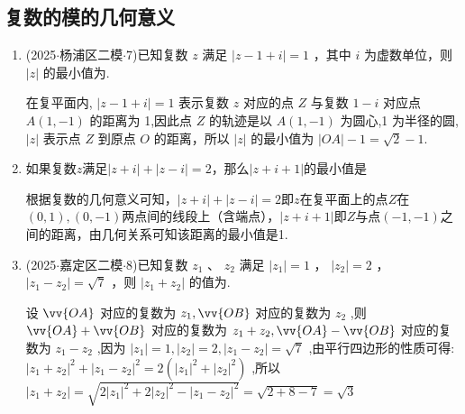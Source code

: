 \subsection*{复数的模的几何意义}
\begin{enumerate}
    \item (2025$\cdot$杨浦区二模$\cdot$7)已知复数 $z$ 满足 $\left| {z - 1 + {i}}\right|  = 1$ ，其中 ${i}$ 为虚数单位，则 $\left| z\right|$ 的最小值为.
    \begin{jieda}
        在复平面内, $\left| {z - 1 + {i}}\right|  = 1$ 表示复数 $z$ 对应的点 $Z$ 与复数 $1 - {i}$ 对应点 $A\left( {1, - 1}\right)$ 的距离为 1,因此点 $Z$ 的轨迹是以 $A\left( {1, - 1}\right)$ 为圆心,1 为半径的圆, $\left| z\right|$ 表示点 $Z$ 到原点 $O$ 的距离，所以 $\left| z\right|$ 的最小值为 $\left| {OA}\right|  - 1 = \sqrt{2} - 1$.
    \end{jieda}
    \item 如果复数$z$满足$|z+i| + |z-i| = 2$，那么$|z+i+1|$的最小值是
    \begin{jieda}
        根据复数的几何意义可知，$|z+i| + |z-i| = 2$即$z$在复平面上的点$Z$在$(0, 1), (0, -1)$两点间的线段上（含端点），$|z+i+1|$即$Z$与点$(-1, -1)$之间的距离，由几何关系可知该距离的最小值是1.
    \end{jieda}
    \item (2025$\cdot$嘉定区二模$\cdot$8)已知复数 ${z}_{1}$ 、 ${z}_{2}$ 满足 $\left| {z}_{1}\right|  = 1$ ， $\left| {z}_{2}\right|  = 2$ ， $\left| {{z}_{1} - {z}_{2}}\right|  = \sqrt{7}$ ，则 $\left| {{z}_{1} + {z}_{2}}\right|$ 的值为.
    \begin{jieda}
        设 $\vv{OA}$ 对应的复数为 ${z}_{1},\vv{OB}$ 对应的复数为 ${z}_{2}$ ,则 $\vv{OA} + \vv{OB}$ 对应的复数为 ${z}_{1} + {z}_{2},\vv{OA} - \vv{OB}$ 对应的复数为 ${z}_{1} -  {z}_{2}$ ,因为 $\left| {z}_{1}\right|  = 1,\left| {z}_{2}\right|  = 2,\left| {{z}_{1} - {z}_{2}}\right|  = \sqrt{7}$ ,由平行四边形的性质可得: ${\left| {z}_{1} + {z}_{2}\right| }^{2} + {\left| {z}_{1} - {z}_{2}\right| }^{2} = 2\left( {{\left| {z}_{1}\right| }^{2} + {\left| {z}_{2}\right| }^{2}}\right)$ ,所以 $\left| {{z}_{1} + {z}_{2}}\right|  = \sqrt{2{\left| {z}_{1}\right| }^{2} + 2{\left| {z}_{2}\right| }^{2} - {\left| {z}_{1} - {z}_{2}\right| }^{2}} = \sqrt{2 + 8 - 7} =  \sqrt{3}$
    \end{jieda}
\end{enumerate}

